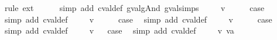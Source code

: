 \begin{isabellebody}
\ {\isacharparenleft}rule\ ext{\isacharparenright}{\isacharplus}\isanewline
\ \ \ \ \isamarkupfalse%
\ {\isacharparenleft}simp\ add{\isacharcolon}\ cval{\isacharunderscore}def\ gval{\isacharunderscore}gAnd\ gval{\isachardot}simps{\isacharparenleft}{}{\isacharparenright}{\isacharparenright}\isanewline
{}\isamarkupfalse%
\isanewline
\ \ \isamarkupfalse%
\ {\isacharparenleft}{\isachardoublequoteopen}{}{\isacharunderscore}{}{}{\isachardoublequoteclose}\ v{\isacharparenright}\isanewline
\ \ \isamarkupfalse%
\ \isamarkupfalse%
\ {\isacharquery}case\ \isamarkupfalse%
\ {\isacharparenleft}simp\ add{\isacharcolon}\ cval{\isacharunderscore}def{\isacharparenright}\isanewline
{}\isamarkupfalse%
\isanewline
\ \ \isamarkupfalse%
\ {\isacharparenleft}{\isachardoublequoteopen}{}{\isacharunderscore}{}{}{\isachardoublequoteclose}\ v{\isacharparenright}\isanewline
\ \ \isamarkupfalse%
\ \isamarkupfalse%
\ {\isacharquery}case\ \isamarkupfalse%
\ {\isacharparenleft}simp\ add{\isacharcolon}\ cval{\isacharunderscore}def{\isacharparenright}\isanewline
{}\isamarkupfalse%
\isanewline
\ \ \isamarkupfalse%
\ {\isacharparenleft}{\isachardoublequoteopen}{}{\isacharunderscore}{}{}{\isachardoublequoteclose}\ v{\isacharparenright}\isanewline
\ \ \isamarkupfalse%
\ \isamarkupfalse%
\ {\isacharquery}case\ \isamarkupfalse%
\ {\isacharparenleft}simp\ add{\isacharcolon}\ cval{\isacharunderscore}def{\isacharparenright}\isanewline
{}\isamarkupfalse%
\isanewline
\ \ \isamarkupfalse%
\ {\isacharparenleft}{\isachardoublequoteopen}{}{\isacharunderscore}{}{}{\isachardoublequoteclose}\ v{\isacharparenright}\isanewline
{}\isamarkupfalse%
\ \isamarkupfalse%
\ {\isacharquery}case\ \isamarkupfalse%
\ {\isacharparenleft}simp\ add{\isacharcolon}\ cval{\isacharunderscore}def{\isacharparenright}\isanewline
{}\isamarkupfalse%
\isanewline
\ \ \isamarkupfalse%
\ {\isacharparenleft}{\isachardoublequoteopen}{}{\isacharunderscore}{}{}{\isachardoublequoteclose}\ v\ va{\isacharparenright}\isanewline
{}\isamarkupfalse%
\ \isamarkupfalse%

\end{isabellebody}
